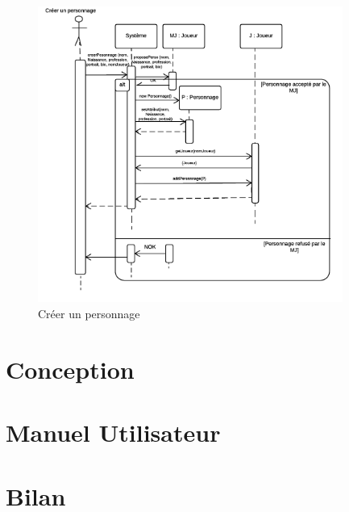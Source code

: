 \documentclass[a4paper,oneside,10pt]{article}
\begin{document}
\begin{figure}[!ht]
	\begin{center}
		\includegraphics[width=10cm]{images/sequence/DS-CreerPerso.png}  
		\caption{Créer un personnage}
	\end{center}
\end{figure}
\section{Conception}


\section{Manuel Utilisateur}


\section{Bilan}
\end{document}
